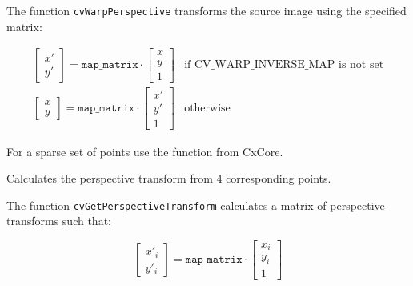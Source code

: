 The function \texttt{cvWarpPerspective} transforms the source image using the specified matrix:

\[
\begin{matrix}
\begin{bmatrix}
x'\\
y'
\end{bmatrix} = \texttt{map\_matrix} \cdot \begin{bmatrix}
x\\
y\\
1
\end{bmatrix} & \mbox{if CV\_WARP\_INVERSE\_MAP is not set}\\
\begin{bmatrix}
x\\
y
\end{bmatrix} = \texttt{map\_matrix} \cdot \begin{bmatrix}
x'\\
y'\\
1
\end{bmatrix}& \mbox{otherwise}
\end{matrix}
\]

For a sparse set of points use the  function from CxCore.


\label{GetPerspectiveTransform}

Calculates the perspective transform from 4 corresponding points.


\begin{description}
\end{description}

The function \texttt{cvGetPerspectiveTransform} calculates a matrix of perspective transforms such that:

\[
\begin{bmatrix}
x'_i\\
y'_i
\end{bmatrix}
=
\texttt{map\_matrix}
\cdot
\begin{bmatrix}
x_i\\
y_i\\
1
\end{bmatrix}
\]

